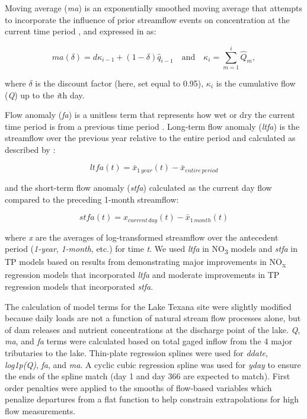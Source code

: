 \documentclass[water,article,submit,oneauthor]{Definitions/mdpi}
\begin{document}
Moving average (\emph{ma}) is an exponentially smoothed moving average
that attempts to incorporate the influence of prior streamflow events on
concentration at the current time period
\citep{wangLoadEstimationUncertainties2011, kuhnert_quantifying_2012, zhang_improving_2017},
and expressed in \citet{kuhnert_quantifying_2012} as:

\begin{equation}\label{eq:2}
ma(\delta) = d{\kappa_{i-1}}+(1-\delta)\hat{q}_{i-1}\quad\text{and}\quad \kappa_{i}=\sum_{m=1}^{i}\hat{Q}_m,
\end{equation}

where \(\delta\) is the discount factor (here, set equal to 0.95),
\(\kappa_i\) is the cumulative flow (\emph{Q}) up to the \emph{i}th day.

Flow anomaly (\emph{fa}) is a unitless term that represents how wet or
dry the current time period is from a previous time period
\citep{vecchia_trends_2009, zhang_improving_2017}. Long-term flow
anomaly (\emph{ltfa}) is the streamflow over the previous year relative
to the entire period and calculated as described by
\citet{zhang_improving_2017}:

\begin{equation}\label{eq:3}
ltfa(t) = \bar{x}_{1\,year}(t) - \bar{x}_{entire\,period} 
\end{equation}

and the short-term flow anomaly (\emph{stfa}) calculated as the current
day flow compared to the preceding 1-month streamflow:

\begin{equation}\label{eq:4}
stfa(t) = x_{current\,day}(t) - \bar{x}_{1\,month}(t) 
\end{equation}

where \emph{x} are the averages of log-transformed streamflow over the
antecedent period (\emph{1-year}, \emph{1-month}, etc.) for time
\emph{t}. We used \emph{ltfa} in NO\textsubscript{3} models and
\emph{stfa} in TP models based on results from
\citet{zhang_improving_2017} demonstrating major improvements in
NO\textsubscript{x} regression models that incorporated \emph{ltfa} and
moderate improvements in TP regression models that incorporated
\emph{stfa}.

The calculation of model terms for the Lake Texana site were slightly
modified because daily loads are not a function of natural stream flow
processes alone, but of dam releases and nutrient concentrations at the
discharge point of the lake. \emph{Q}, \emph{ma}, and \emph{fa} terms
were calculated based on total gaged inflow from the 4 major tributaries
to the lake. Thin-plate regression splines were used for \emph{ddate},
\emph{log1p(Q)}, \emph{fa}, and \emph{ma}. A cyclic cubic regression
spline was used for \emph{yday} to ensure the ends of the spline match
(day 1 and day 366 are expected to match). First order penalties were
applied to the smooths of flow-based variables which penalize departures
from a flat function to help constrain extrapolations for high flow
measurements.
\end{document}
